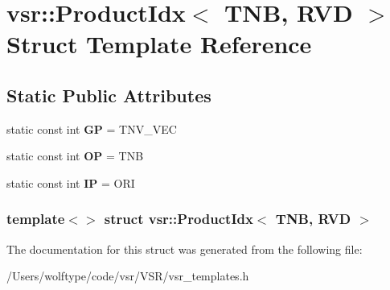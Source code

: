 \hypertarget{structvsr_1_1_product_idx_3_01_t_n_b_00_01_r_v_d_01_4}{\section{vsr\-:\-:Product\-Idx$<$ T\-N\-B, R\-V\-D $>$ Struct Template Reference}
\label{structvsr_1_1_product_idx_3_01_t_n_b_00_01_r_v_d_01_4}
}
\subsection*{Static Public Attributes}
\begin{DoxyCompactItemize}
\item 
\hypertarget{structvsr_1_1_product_idx_3_01_t_n_b_00_01_r_v_d_01_4_af67df0f6c29a37729c5e2faa4c6f101f}{static const int {\bfseries G\-P} = T\-N\-V\-\_\-\-V\-E\-C}\label{structvsr_1_1_product_idx_3_01_t_n_b_00_01_r_v_d_01_4_af67df0f6c29a37729c5e2faa4c6f101f}

\item 
\hypertarget{structvsr_1_1_product_idx_3_01_t_n_b_00_01_r_v_d_01_4_af36a4f0978f6b8295b16f6db872cfdae}{static const int {\bfseries O\-P} = T\-N\-B}\label{structvsr_1_1_product_idx_3_01_t_n_b_00_01_r_v_d_01_4_af36a4f0978f6b8295b16f6db872cfdae}

\item 
\hypertarget{structvsr_1_1_product_idx_3_01_t_n_b_00_01_r_v_d_01_4_aac6bb71b7a750f721dd093aa1363d27b}{static const int {\bfseries I\-P} = O\-R\-I}\label{structvsr_1_1_product_idx_3_01_t_n_b_00_01_r_v_d_01_4_aac6bb71b7a750f721dd093aa1363d27b}

\end{DoxyCompactItemize}
\subsubsection*{template$<$$>$ struct vsr\-::\-Product\-Idx$<$ T\-N\-B, R\-V\-D $>$}



The documentation for this struct was generated from the following file\-:\begin{DoxyCompactItemize}
\item 
/\-Users/wolftype/code/vsr/\-V\-S\-R/vsr\-\_\-templates.\-h\end{DoxyCompactItemize}
